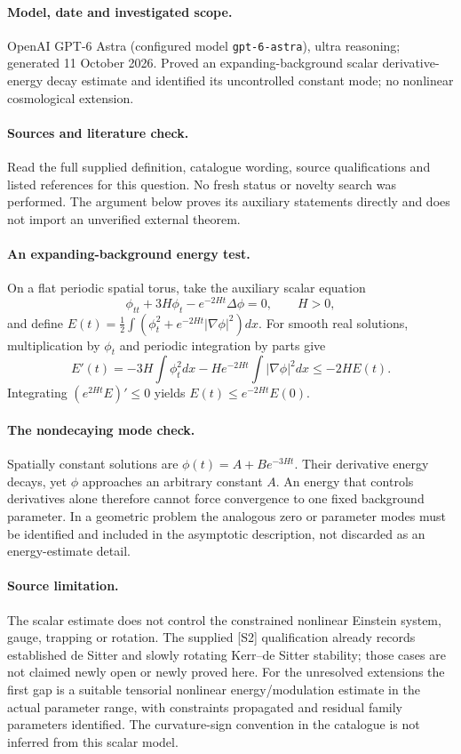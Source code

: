 \documentclass[11pt]{article}
\begin{document}
\paragraph{Model, date and investigated scope.}
OpenAI GPT-6 Astra (configured model \texttt{gpt-6-astra}), ultra reasoning; generated 11 October 2026. Proved an expanding-background scalar derivative-energy decay estimate and identified its uncontrolled constant mode; no nonlinear cosmological extension.

\paragraph{Sources and literature check.}
Read the full supplied definition, catalogue wording, source qualifications and listed references for this question. No fresh status or novelty search was performed. The argument below proves its auxiliary statements directly and does not import an unverified external theorem.

\paragraph{An expanding-background energy test.} On a flat periodic spatial torus, take the auxiliary scalar equation
\[
 \phi_{tt}+3H\phi_t-e^{-2Ht}\Delta\phi=0,\qquad H>0,
\]
and define \(E(t)=\frac12\int(\phi_t^2+e^{-2Ht}|\nabla\phi|^2)dx\). For smooth real solutions, multiplication by \(\phi_t\) and periodic integration by parts give
\[
 E'(t)=-3H\int\phi_t^2dx-H e^{-2Ht}\int|\nabla\phi|^2dx\leq-2HE(t).
\]
Integrating \((e^{2Ht}E)'\leq0\) yields \(E(t)\leq e^{-2Ht}E(0)\).
\paragraph{The nondecaying mode check.} Spatially constant solutions are \(\phi(t)=A+B e^{-3Ht}\). Their derivative energy decays, yet \(\phi\) approaches an arbitrary constant \(A\). An energy that controls derivatives alone therefore cannot force convergence to one fixed background parameter. In a geometric problem the analogous zero or parameter modes must be identified and included in the asymptotic description, not discarded as an energy-estimate detail.
\paragraph{Source limitation.} The scalar estimate does not control the constrained nonlinear Einstein system, gauge, trapping or rotation. The supplied [S2] qualification already records established de Sitter and slowly rotating Kerr--de Sitter stability; those cases are not claimed newly open or newly proved here. For the unresolved extensions the first gap is a suitable tensorial nonlinear energy/modulation estimate in the actual parameter range, with constraints propagated and residual family parameters identified. The curvature-sign convention in the catalogue is not inferred from this scalar model.
\end{document}

